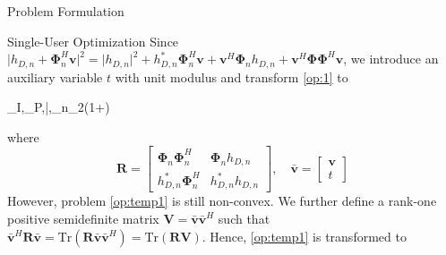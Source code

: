 \documentclass{IEEEtran}
\begin{document}
\begin{section}{Problem Formulation}
\begin{subsection}{Single-User Optimization}
		Since $\lvert{h_{D,n}+\boldsymbol{\Phi}_n^H\boldsymbol{v}}\rvert^2=\lvert{h_{D,n}}\rvert^2+h_{D,n}^*\boldsymbol{\Phi}_n^H\boldsymbol{v}+\boldsymbol{v}^H\boldsymbol{\Phi}_n{h_{D,n}}+\boldsymbol{v}^H\boldsymbol{\Phi}\boldsymbol{\Phi}^H\boldsymbol{v}$, we introduce an auxiliary variable $t$ with unit modulus and transform \ref{op:1} to
		\begin{maxi}
			{\boldsymbol{w}_I,_P,\bar{},\rho}{\sum_{n}{\log_2\left(1+\right)}}{\label{op:temp1}}{}
		\end{maxi}
		where
		\begin{equation}
			\boldsymbol{R}=
			\begin{bmatrix}
				\boldsymbol{\Phi}_n\boldsymbol{\Phi}_n^H & \boldsymbol{\Phi}_n{h_{D,n}} \\
				h_{D,n}^*{\boldsymbol{\Phi}_n^H}         & h_{D,n}^*{h_{D,n}}
			\end{bmatrix},
			\quad \bar{\boldsymbol{v}}=
			\begin{bmatrix}
				\boldsymbol{v} \\
				t
			\end{bmatrix}
		\end{equation}
		However, problem \ref{op:temp1} is still non-convex. We further define a rank-one positive semidefinite matrix $\boldsymbol{V}=\bar{\boldsymbol{v}}\bar{\boldsymbol{v}}^H$ such that $\bar{\boldsymbol{v}}^H\boldsymbol{R}\bar{\boldsymbol{v}}=\mathrm{Tr}(\boldsymbol{R}\bar{\boldsymbol{v}}\bar{\boldsymbol{v}}^H)=\mathrm{Tr}(\boldsymbol{R}\boldsymbol{V})$. Hence, \ref{op:temp1} is transformed to

\end{subsection}
\end{section}
\end{document}
